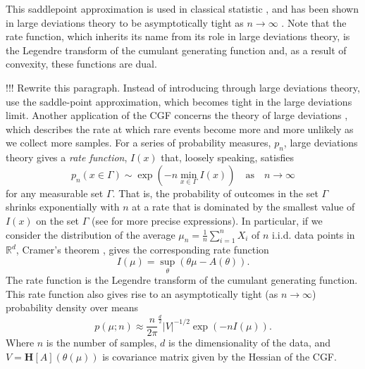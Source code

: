 \documentclass[11pt]{article}      %
\begin{document}
This saddlepoint approximation is used in classical statistic \cite{daniels_saddlepoint_1954,barndorff-nielsen_edgeworth_1979,davison_saddlepoint_1988,ronchetti_empirical_1994}, and has been shown in large deviations theory \cite{dembo2009large} to be asymptotically tight as $n \to \infty$ \cite{iltis_sharp_1995,chaganty_multidimensional_1986}.
Note that the rate function, which inherits its name from its role in large deviations theory, is the Legendre transform of the cumulant generating function and, as a result of convexity, these functions are dual.




!!! Rewrite this paragraph. Instead of introducing through large deviations theory, use the saddle-point approximation, which becomes tight in the large deviations limit.
Another application of the CGF concerns the theory of large deviations \cite{dembo2009large}, which describes the rate at which rare events become more and more unlikely as we collect more samples. 
For a series of probability measures, $p_n$, large deviations theory gives a \textit{rate function}, $I(x)$ that, loosely speaking, satisfies
\begin{equation}
  p_n(x \in \Gamma) \sim \exp \left( - n \min_{x \in \Gamma} I(x) \right) \quad \textrm{as} \quad n \to \infty 
\end{equation}
for any measurable set $\Gamma$.
That is, the probability of outcomes in the set $\Gamma$ shrinks exponentially with $n$ at a rate that is dominated by the smallest value of $I(x)$ on the set $\Gamma$ (see \cite{dembo2009large} for more precise expressions).
In particular, if we consider the distribution of the average $\mu_n = \frac{1}{n} \sum_{i=1}^n X_i$ of $n$ i.i.d. data points in $\mathbb{R}^d$, Cramer's theorem \cite{dembo2009large}, gives the corresponding rate function
\begin{equation}
  I(\mu) = \sup_{\theta}( \theta \mu - A(\theta) ).
\end{equation}
The rate function is the Legendre transform of the cumulant generating function.
This rate function also gives rise to an asymptotically tight (as $n \to \infty$) probability density over means \cite{iltis_sharp_1995,chaganty_multidimensional_1986}
\begin{equation}
  p(\mu; n) \approx \frac{n}{2\pi}^{\frac{d}{2}} |V|^{-1/2} \exp(-n I(\mu)). 
\end{equation}
Where $n$ is the number of samples, $d$ is the dimensionality of the data, and $V = {\bm H}[A](\theta(\mu))$ is covariance matrix given by the Hessian of the CGF.
\end{document}
